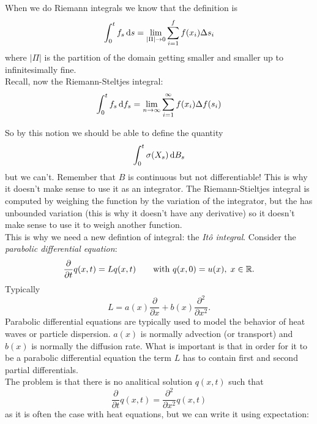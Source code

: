 \documentclass[crop=false, class=article]{standalone}
\begin{document}
\begin{revise}
	When we do Riemann integrals we know that the definition is 
	\begin{equation*}
		\int_{0}^{t}f_{s}\mathop{}\!\mathrm{d} s=\lim_{|\Pi|\to 0}\sum_{i=1}^{f}f(x_{i})\Delta s_{i}
	\end{equation*}
	where $|\Pi|$ is the partition of the domain getting smaller and smaller up to infinitesimally fine.\\
	Recall, now the Riemann-Steltjes integral:
	\begin{equation*}
		\int_{0}^{t}f_{s}\mathop{}\!\mathrm{d} f_{s}=\lim_{n\to\infty}\sum_{i=1}^{\infty}f(x_{i})\Delta f(s_{i})
	\end{equation*}
\end{revise}
	So by this notion we should be able to define the quantity
	\begin{equation*}
		\int_{0}^{t}\sigma(X_{s})\mathop{}\!\mathrm{d} B_{s}
	\end{equation*}
	but we can't. Remember that $B$ is continuous but not differentiable! This is why it doesn't make sense to use it as an integrator. The Riemann-Stieltjes integral is computed by weighing the function by the variation of the integrator, but the \brm{} has unbounded variation (this is why it doesn't have any derivative) so it doesn't make sense to use it to weigh another function. \\
	This is why we need a new defintion of integral: the \emph{It\^o integral}.
Consider the \textit{parabolic differential equation}:
\begin{equation*}
	\frac{\partial}{\partial t}q(x,t)=Lq(x,t)\qquad\text{with }q(x,0)=u(x),\;x\in\mathbb{R}.
\end{equation*}
Typically 
\begin{equation*}
	L=a(x)\frac{\partial}{\partial x}+b(x)\frac{\partial^{2}}{\partial x^{2}}.
\end{equation*}
Parabolic differential equations are typically used to model the behavior of heat waves or particle dispersion. $a(x)$ is normally advection (or transport) and $b(x)$ is normally the diffusion rate. What is important is that in order for it to be a parabolic differential equation the term $L$ has to contain first and second partial differentials.\\
The problem is that there is no analitical solution $q(x,t)$ such that
\begin{equation*}
	\frac{\partial}{\partial t}q(x,t)=\frac{\partial^{2}}{\partial x^{2}}q(x,t)
\end{equation*}
as it is often the case with heat equations, but we can write it using expectation:
\end{document}
